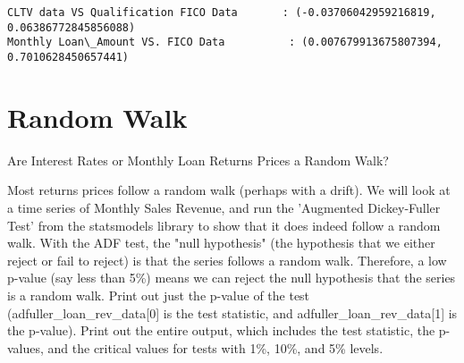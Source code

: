 \documentclass[11pt]{article}
\begin{document}
    \begin{Verbatim}[commandchars=\\\{\}]
CLTV data VS Qualification FICO Data       : (-0.03706042959216819, 0.06386772845856088)
Monthly Loan\_Amount VS. FICO Data          : (0.007679913675807394, 0.7010628450657441)

    \end{Verbatim}

    \section{Random Walk}\label{random-walk}

Are Interest Rates or Monthly Loan Returns Prices a Random Walk?

Most returns prices follow a random walk (perhaps with a drift). We will
look at a time series of Monthly Sales Revenue, and run the 'Augmented
Dickey-Fuller Test' from the statsmodels library to show that it does
indeed follow a random walk. With the ADF test, the "null hypothesis"
(the hypothesis that we either reject or fail to reject) is that the
series follows a random walk. Therefore, a low p-value (say less than
5\%) means we can reject the null hypothesis that the series is a random
walk. Print out just the p-value of the test
(adfuller\_loan\_rev\_data{[}0{]} is the test statistic, and
adfuller\_loan\_rev\_data{[}1{]} is the p-value). Print out the entire
output, which includes the test statistic, the p-values, and the
critical values for tests with 1\%, 10\%, and 5\% levels.
\end{document}
